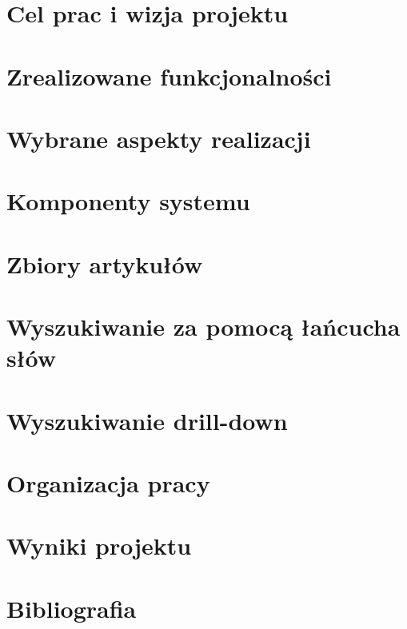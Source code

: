 \documentclass[12pt]{report}
\begin{document}


\tableofcontents

\chapter{Cel prac i wizja projektu}


\chapter{Zrealizowane funkcjonalności}


\chapter{Wybrane aspekty realizacji}



\chapter{Komponenty systemu}


\chapter{Zbiory artykułów}


\chapter{Wyszukiwanie za pomocą łańcucha słów}


\chapter{Wyszukiwanie drill-down}


\chapter{Organizacja pracy}


\chapter{Wyniki projektu}


\chapter{Bibliografia}

\end{document}
